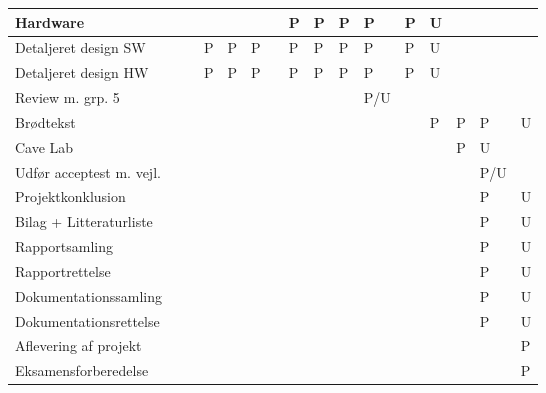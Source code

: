 \documentclass[landscape, 12pt, letterpaper]{article}
\begin{document}
\begin{table}[]
\begin{tabular}{|l|l|l|l|l|l|l|l|l|l|l|l|l|l|l|l|}
Hardware                &    &    &    &    &    &    & P  & P  & P  & P  & P  & U  &    &    &    \\ \hline
Detaljeret design SW    &    &    &  P &  P & P  &    &  P & P  & P  &  P & P  & U  &    &    &    \\ \hline
Detaljeret design HW    &    &    &  P &  P & P  &    &  P & P  & P  &  P & P  & U  &    &    &    \\ \hline
Review m. grp. 5        &    &    &    &    &    &    &    &    &    & P/U &    &    &    &    &    \\ \hline
Brødtekst               &    &    &    &    &    &    &    &    &    &    &    &  P & P  & P  &  U \\ \hline
Cave Lab                &    &    &    &    &    &    &    &    &    &    &    &    & P  & U  &    \\ \hline
Udfør acceptest m. vejl.&    &    &    &    &    &    &    &    &    &    &    &    &    & P/U &    \\ \hline
Projektkonklusion       &    &    &    &    &    &    &    &    &    &    &    &    &    & P  &  U \\ \hline
Bilag + Litteraturliste &    &    &    &    &    &    &    &    &    &    &    &    &    &  P &  U \\ \hline
Rapportsamling          &    &    &    &    &    &    &    &    &    &    &    &    &    &  P &  U \\ \hline
Rapportrettelse         &    &    &    &    &    &    &    &    &    &    &    &    &    &  P &  U \\ \hline
Dokumentationssamling   &    &    &    &    &    &    &    &    &    &    &    &    &    &  P &  U \\ \hline
Dokumentationsrettelse  &    &    &    &    &    &    &    &    &    &    &    &    &    &  P &  U \\ \hline
Aflevering af projekt   &    &    &    &    &    &    &    &    &    &    &    &    &    &    &  P \\ \hline
Eksamensforberedelse    &    &    &    &    &    &    &    &    &    &    &    &    &    &    &  P \\ \hline

\end{tabular}
\end{table}
\end{document}
